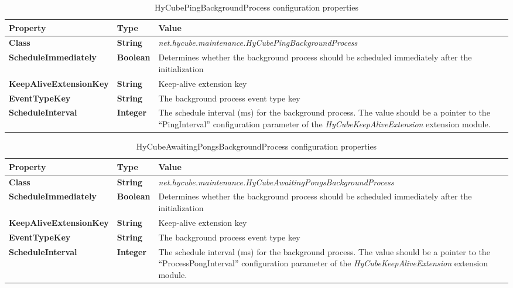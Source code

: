 \begin{table}
\scriptsize
\begin{center}
\begin{tabular}{p{5.5cm} p{1.0cm} p{8.0cm}}
	\hline
	\textbf{Property}							& \textbf{Type}					& \textbf{Value}					\\[1mm]
    \hline
	\textbf{Class}								& \textbf{String}				& \textit{net.hycube.maintenance.HyCubePingBackgroundProcess}										\\[1.5mm]	
	\textbf{ScheduleImmediately}				& \textbf{Boolean}				& Determines whether the background process should be scheduled immediately after the initialization		\\[1.5mm]	
	\textbf{KeepAliveExtensionKey}				& \textbf{String}				& Keep-alive extension key																							\\[1.5mm]	
	\textbf{EventTypeKey}						& \textbf{String}				& The background process event type key																		\\[1.5mm]	
	\textbf{ScheduleInterval}					& \textbf{Integer}				& The schedule interval (ms) for the background process. The value should be a pointer to the ``PingInterval'' configuration parameter of the \emph{HyCubeKeepAliveExtension} extension module.															\\[1.5mm]	
    \hline
\end{tabular}
\end{center}
\caption{HyCubePingBackgroundProcess configuration properties}
\label{tab:libHyCubePingBackgroundProcess}
\end{table}

\begin{table}
\scriptsize
\begin{center}
\begin{tabular}{p{5.5cm} p{1.0cm} p{8.0cm}}
	\hline
	\textbf{Property}							& \textbf{Type}					& \textbf{Value}					\\[1mm]
    \hline
	\textbf{Class}								& \textbf{String}				& \textit{net.hycube.maintenance.HyCubeAwaitingPongsBackgroundProcess}										\\[1.5mm]	
	\textbf{ScheduleImmediately}				& \textbf{Boolean}				& Determines whether the background process should be scheduled immediately after the initialization		\\[1.5mm]	
	\textbf{KeepAliveExtensionKey}				& \textbf{String}				& Keep-alive extension key																							\\[1.5mm]	
	\textbf{EventTypeKey}						& \textbf{String}				& The background process event type key																		\\[1.5mm]	
	\textbf{ScheduleInterval}					& \textbf{Integer}				& The schedule interval (ms) for the background process. The value should be a pointer to the ``ProcessPongInterval'' configuration parameter of the \emph{HyCubeKeepAliveExtension} extension module.												\\[1.5mm]	
    \hline
\end{tabular}
\end{center}
\caption{HyCubeAwaitingPongsBackgroundProcess configuration properties}
\label{tab:libHyCubeAwaitingPongsBackgroundProcess}
\end{table}



